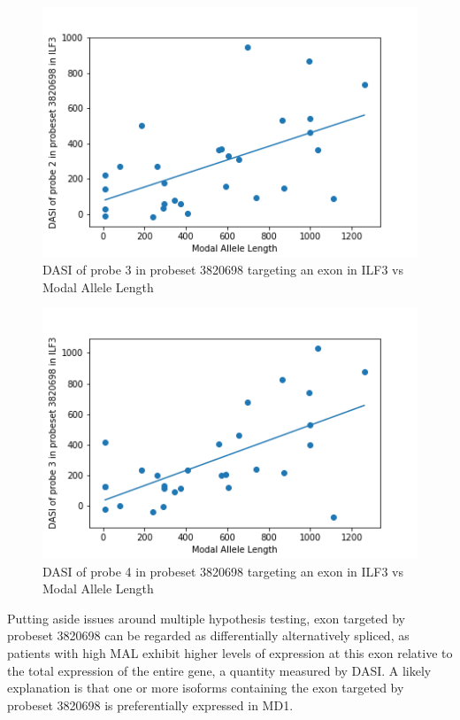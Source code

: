 \begin{figure}
	\centering
	\includegraphics[width=135mm]{probeILF32.png}
	\caption{DASI of probe 3 in probeset 3820698 targeting an exon in ILF3 vs Modal Allele Length}
    \label{probeILF32}
\end{figure}

\begin{figure}
	\centering
	\includegraphics[width=135mm]{probeILF33.png} \caption{DASI of probe 4 in probeset 3820698 targeting an exon in ILF3 vs Modal Allele Length}
    \label{probeILF33}
\end{figure}

Putting aside issues around multiple hypothesis testing, exon targeted by probeset 3820698 can be regarded as differentially alternatively spliced, as patients with high MAL exhibit higher levels of expression at this exon relative to the total expression of the entire gene, a quantity measured by DASI. A likely explanation is that one or more isoforms containing the exon targeted by probeset 3820698 is preferentially expressed in MD1.

